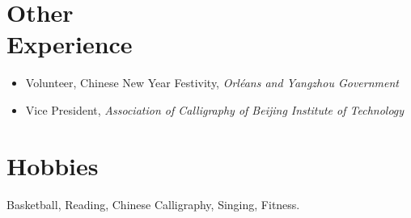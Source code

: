 \documentclass{mycv}
\begin{document}
\vspace{-0.5em}

\section{Other \\ Experience}

\begin{itemize}
  \itemsep 0em
  \item  Volunteer, Chinese New Year Festivity, \emph{Orl\'eans and Yangzhou Government} 
  \item Vice President, \emph{Association of Calligraphy of Beijing Institute of Technology} 
\end{itemize}

\section{Hobbies}

Basketball, Reading, Chinese Calligraphy, Singing, Fitness.
\end{document}
